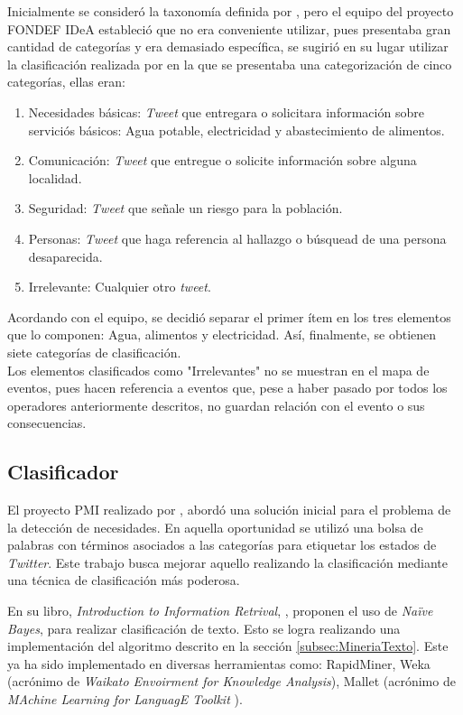 Inicialmente se consideró la taxonomía definida por \cite{TaxonomiaChato}, pero el equipo del proyecto FONDEF IDeA estableció que no era conveniente utilizar, pues presentaba gran cantidad de categorías y era demasiado específica, se sugirió en su lugar utilizar la clasificación realizada por \cite{PMIProfes} en la que se presentaba una categorización de cinco categorías, ellas eran:

\begin{enumerate}
\item Necesidades básicas: \textit{Tweet} que entregara o solicitara información sobre serviciós básicos: Agua potable, electricidad y abastecimiento de alimentos.
\item Comunicación: \textit{Tweet} que entregue o solicite información sobre alguna localidad.
\item Seguridad: \textit{Tweet} que señale un riesgo para la población.
\item Personas: \textit{Tweet} que haga referencia al hallazgo o búsquead de una persona desaparecida.
\item Irrelevante: Cualquier otro \textit{tweet}.
\end{enumerate}

Acordando con el equipo, se decidió separar el primer ítem en los tres elementos que lo componen: Agua, alimentos y electricidad. Así, finalmente, se obtienen siete categorías de clasificación.\\

Los elementos clasificados como "Irrelevantes" no se muestran en el mapa de eventos, pues hacen referencia a eventos que, pese a haber pasado por todos los operadores anteriormente descritos, no guardan relación con el evento o sus consecuencias.

\subsection{Clasificador}
\label{sec:diseno:clasificador}

El proyecto PMI realizado por \cite{WladdimiroPMI}, abordó una solución inicial para el problema de la detección de necesidades. En aquella oportunidad se utilizó una bolsa de palabras con términos asociados a las categorías para etiquetar los estados de \textit{Twitter}. Este trabajo busca mejorar aquello realizando la clasificación mediante una técnica de clasificación más poderosa.

En su libro, \textit{Introduction to Information Retrival}, \cite{IRQE}, proponen el uso de \textit{Naïve Bayes}, para realizar clasificación de texto. Esto se logra realizando una implementación del algoritmo descrito en la sección \ref{subsec:MineriaTexto}. Este ya ha sido implementado en diversas herramientas como: RapidMiner, Weka (acrónimo de \textit{Waikato Envoirment for Knowledge Analysis}), Mallet (acrónimo de \textit{MAchine Learning for LanguagE Toolkit }).

